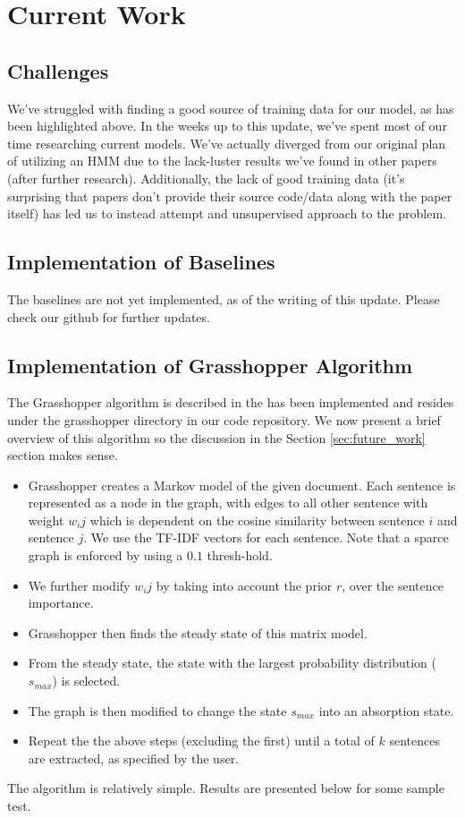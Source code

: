 \documentclass[10pt]{article}
\begin{document}
\section{Current Work}
\subsection{Challenges}
\label{sec:challenges}
We've struggled with finding a good source of training data for our model, as has been highlighted above. In the weeks up to this update, we've spent most of our time researching current models. We've actually diverged from our original plan of utilizing an HMM due to the lack-luster results we've found in other papers (after further research). Additionally, the lack of good training data (it's surprising that papers don't provide their source code/data along with the paper itself) has led us to instead attempt and unsupervised approach to the problem.

\subsection{Implementation of Baselines}
\label{sec:baseline}
The baselines are not yet implemented, as of the writing of this update. Please check our github for further updates.

\subsection{Implementation of Grasshopper Algorithm}
\label{sec:grasshopper}
The Grasshopper algorithm is described in the \cite{grasshopper} has been implemented and resides under the grasshopper directory in our code repository. We now present a brief overview of this algorithm so the discussion in the Section \ref{sec:future_work} section makes sense.
\begin{itemize}
\item Grasshopper creates a Markov model of the given document. Each sentence is represented as a node in the graph, with edges to all other sentence with weight $w_ij$ which is dependent on the cosine similarity between sentence $i$ and sentence $j$. We use the TF-IDF vectors for each sentence. Note that a sparce graph is enforced by using a $0.1$ thresh-hold.
\item We further modify $w_ij$ by taking into account the prior $r$, over the sentence importance.
\item Grasshopper then finds the steady state of this matrix model.
\item From the steady state, the state with the largest probability distribution ($s_{max}$) is selected.
\item The graph is then modified to change the state $s_{max}$ into an absorption state.
\item Repeat the the above steps (excluding the first) until a total of $k$ sentences are extracted, as specified by the user.
\end{itemize}
The algorithm is relatively simple. Results are presented below for some sample test.
\end{document}
